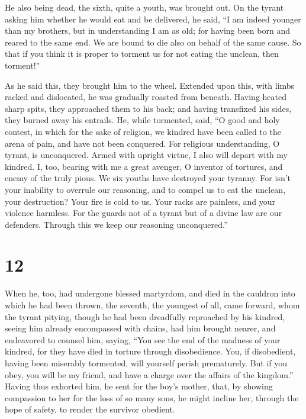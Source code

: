  He also being dead, the sixth, quite a youth, was
brought out. On the tyrant asking him whether he would eat and be
delivered, he said,  ``I am indeed younger than my
brothers, but in understanding I am as old;  for having
been born and reared to the same end. We are bound to die also on behalf
of the same cause.  So that if you think it is proper to
torment us for not eating the unclean, then torment!''

 As he said this, they brought him to the wheel.
 Extended upon this, with limbs racked and dislocated, he
was gradually roasted from beneath.  Having heated sharp
spits, they approached them to his back; and having transfixed his
sides, they burned away his entrails.  He, while
tormented, said, ``O good and holy contest, in which for the sake of
religion, we kindred have been called to the arena of pain, and have not
been conquered.  For religious understanding, O tyrant,
is unconquered.  Armed with upright virtue, I also will
depart with my kindred.  I, too, bearing with me a great
avenger, O inventor of tortures, and enemy of the truly pious.
 We six youths have destroyed your tyranny.
 For isn't your inability to overrule our reasoning, and
to compel us to eat the unclean, your destruction?  Your
fire is cold to us. Your racks are painless, and your violence harmless.
 For the guards not of a tyrant but of a divine law are
our defenders. Through this we keep our reasoning unconquered.''

\hypertarget{section-11}{%
\section{12}\label{section-11}}

 When he, too, had undergone blessed martyrdom, and died
in the cauldron into which he had been thrown, the seventh, the youngest
of all, came forward,  whom the tyrant pitying, though he
had been dreadfully reproached by his kindred,  seeing him
already encompassed with chains, had him brought nearer, and endeavored
to counsel him, saying,  ``You see the end of the madness
of your kindred, for they have died in torture through disobedience.
You, if disobedient, having been miserably tormented, will yourself
perish prematurely.  But if you obey, you will be my
friend, and have a charge over the affairs of the kingdom.''
 Having thus exhorted him, he sent for the boy's mother,
that, by showing compassion to her for the loss of so many sons, he
might incline her, through the hope of safety, to render the survivor
obedient.

